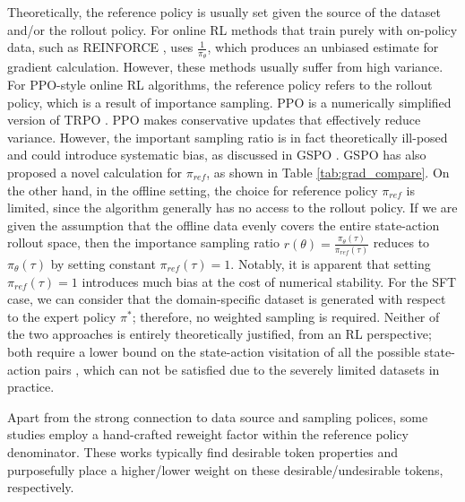 Theoretically, the reference policy is usually set given the source of the dataset and/or the rollout policy. 
For online RL methods that train purely with on-policy data, such as REINFORCE \citep{ahmadian2024back}, uses $\frac{1}{\pi_\theta}$, which produces an unbiased estimate for gradient calculation. However, these methods usually suffer from high variance.
For PPO-style online RL algorithms, the reference policy refers to the rollout policy, which is a result of importance sampling.
PPO is a numerically simplified version of TRPO \citep{schulman2015trust}. PPO makes conservative updates that effectively reduce variance. However, the important sampling ratio is in fact theoretically ill-posed and could introduce systematic bias, as discussed in GSPO \citep{zheng2025group}. GSPO has also proposed a novel calculation for $\pi_{ref}$, as shown in Table \ref{tab:grad_compare}.
On the other hand, in the offline setting, the choice for reference policy $\pi_{ref}$ is limited, since the algorithm generally has no access to the rollout policy. If we are given the assumption that the offline data evenly covers the entire state-action rollout space, then the importance sampling ratio $r(\theta) = \frac{\pi_\theta (\tau ) }{\pi_{ref} (\tau )}$ reduces to $\pi_\theta (\tau )$ by setting constant $\pi_{ref} (\tau ) = 1$. Notably, it is apparent that setting $\pi_{ref} (\tau ) = 1$ introduces much bias at the cost of numerical stability.
For the SFT case, we can consider that the domain-specific dataset is generated with respect to the expert policy $\pi^\ast$; therefore, no weighted sampling is required. 
Neither of the two approaches is entirely theoretically justified, from an RL perspective; both require a lower bound on the state-action visitation of all the possible state-action pairs \citep{kakade2003sample}, which can not be satisfied due to the severely limited datasets in practice.





Apart from the strong connection to data source and sampling polices, some studies employ a hand-crafted reweight factor within the reference policy denominator. These works \citep{yan2025learning, zhang2025policy} typically find desirable token properties and purposefully place a higher/lower weight on these desirable/undesirable tokens, respectively.

